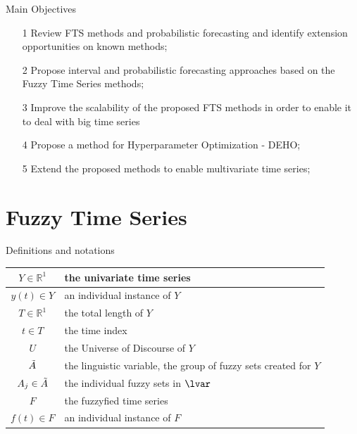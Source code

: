 \documentclass{beamer}
\begin{document}

\begin{frame}{Main Objectives}
\linespread{1.5}
\begin{enumerate}
\item[1] Review FTS methods and probabilistic forecasting and identify extension opportunities on known  methods;
\item[2] Propose interval and probabilistic forecasting approaches based on the Fuzzy Time Series methods;
\item[3] Improve the scalability of the proposed FTS methods in order to enable it to deal with big time series
\item[4] Propose a method for Hyperparameter Optimization - DEHO;
\item[5] Extend the proposed methods to enable multivariate time series;
\end{enumerate}
\end{frame}



\section{Fuzzy Time Series}


\begin{frame}{Definitions and notations}
\begin{table}[]
    \centering
    \begin{tabular}{|c|m{7cm}|} \hline
        $Y \in \mathbb{R}^1$ &  the univariate time series \\ \hline
        $y(t) \in Y$ & an individual instance of $Y$ \\ \hline
        $T \in \mathbb{R}^1$ & the total length of $Y$ \\ \hline
        $t \in T$ & the time index \\ \hline
        $U$ & the Universe of Discourse of $Y$ \\ \hline
        $\tilde{A}$ & the linguistic variable, the group of fuzzy sets created for $Y$ \\ \hline
        $A_j \in \tilde{A}$ & the individual fuzzy sets in $\lvar$ \\ \hline
        $F$ & the fuzzyfied time series \\ \hline
        $f(t) \in F$ & an individual instance of $F$ \\ \hline
    \end{tabular}
\end{table}
\end{frame}
\end{document}
